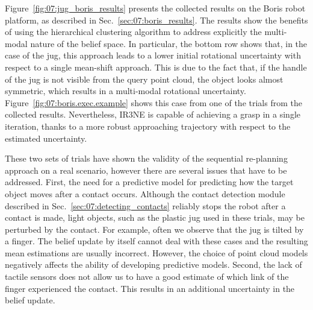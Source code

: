 Figure~\ref{fig:07:jug_boris_results} presents the collected results on the Boris robot platform, as described in Sec.~\ref{sec:07:boris_results}. The results show the benefits of using the hierarchical clustering algorithm to address explicitly the multi-modal nature of the belief space. In particular, the bottom row shows that, in the case of the jug, this approach leads to a lower initial rotational uncertainty with respect to a single mean-shift approach. This is due to the fact that, if the handle of the jug is not visible from the query point cloud, the object looks almost symmetric, which results in a multi-modal rotational uncertainty. Figure~\ref{fig:07:boris.exec.example} shows this case from one of the trials from the collected results. Nevertheless, IR3NE is capable of achieving a grasp in a single iteration, thanks to a more robust approaching trajectory with respect to the estimated uncertainty. 

These two sets of trials have shown the validity of the sequential re-planning approach on a real scenario, however there are several issues that have to be addressed. First, the need for a predictive model for predicting how the target object moves after a contact occurs. Although the contact detection module described in Sec.~\ref{sec:07:detecting_contacts} reliably stops the robot after a contact is made, light objects, such as the plastic jug used in these trials, may be perturbed by the contact. For example, often we observe that the jug is tilted by a finger. The belief update by itself cannot deal with these cases and the resulting mean estimations are usually incorrect. However, the choice of point cloud models negatively affects the ability of developing predictive models.
Second, the lack of tactile sensors does not allow us to have a good estimate of which link of the finger experienced the contact. This results in an additional uncertainty in the belief update. 

